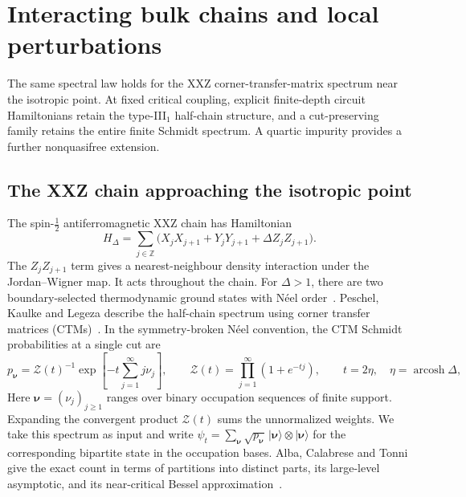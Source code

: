 \section{Interacting bulk chains and local perturbations}\label{sec:interacting}

The same spectral law holds for the XXZ corner-transfer-matrix spectrum
near the isotropic point.
At fixed critical coupling, explicit finite-depth circuit Hamiltonians
retain the type-III$_1$ half-chain structure, and a cut-preserving family
retains the entire finite Schmidt spectrum. A quartic impurity provides
a further nonquasifree extension.

\subsection{The XXZ chain approaching the isotropic point}

The spin-$\tfrac12$ antiferromagnetic XXZ chain has Hamiltonian
\[
 H_\Delta=\sum_{j\in\mathbb Z}
 \bigl(X_jX_{j+1}+Y_jY_{j+1}+\Delta Z_jZ_{j+1}\bigr).
\]
The $Z_jZ_{j+1}$ term gives a nearest-neighbour density interaction
under the Jordan--Wigner map. It acts throughout the chain. For
$\Delta>1$, there are two boundary-selected thermodynamic ground states
with N\'eel order~\cite[Proposition~1.3 and Theorem~1.4]{ADW20}.
Peschel, Kaulke and Legeza describe the half-chain spectrum using
corner transfer matrices (CTMs)~\cite[Sec.~3]{PKL99}. In the
symmetry-broken N\'eel convention, the CTM Schmidt probabilities at a
single cut are~\cite[Eqs.~(30)--(37)]{ACT18}
\begin{equation}\label{eq:xxz-ctm-spectrum}
 p_{\boldsymbol\nu}=\mathcal Z(t)^{-1}
       \exp\!\left[-t\sum_{j=1}^{\infty}j\nu_j\right],
 \qquad \mathcal Z(t)=\prod_{j=1}^{\infty}(1+e^{-tj}),
 \qquad t=2\eta,\quad \eta=\operatorname{arcosh}\Delta ,
\end{equation}
Here $\boldsymbol\nu=(\nu_j)_{j\geq1}$ ranges over binary occupation
sequences of finite support. Expanding the convergent product
$\mathcal Z(t)$ sums the unnormalized weights. We take this spectrum
as input and write
$\psi_t=\sum_{\boldsymbol\nu}\sqrt{p_{\boldsymbol\nu}}\,
  |\boldsymbol\nu\rangle\otimes|\boldsymbol\nu\rangle$
for the corresponding bipartite state in the occupation bases.
Alba, Calabrese and Tonni give the exact count in terms of partitions
into distinct parts, its large-level asymptotic, and its near-critical
Bessel approximation~\cite[Eqs.~(39)--(42) and~(47)]{ACT18}.

